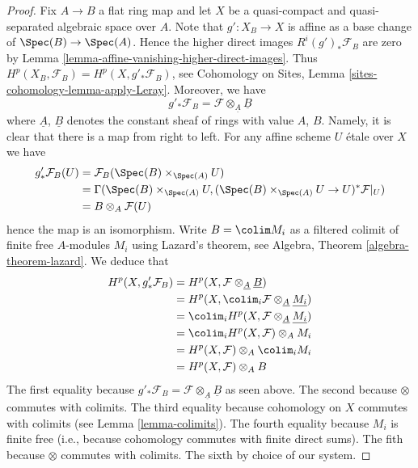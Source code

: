 \begin{proof}
\medskip\noindent
Fix $A \to B$ a flat ring map and let $X$ be a quasi-compact and
quasi-separated algebraic space over $A$. Note that $g' : X_B \to X$
is affine as a base change of $\Spec(B) \to \Spec(A)$. Hence
the higher direct images $R^i(g')_*\mathcal{F}_B$ are zero by
Lemma \ref{lemma-affine-vanishing-higher-direct-images}.
Thus $H^p(X_B, \mathcal{F}_B) = H^p(X, g'_*\mathcal{F}_B)$, see
Cohomology on Sites, Lemma \ref{sites-cohomology-lemma-apply-Leray}.
Moreover, we have
$$
g'_*\mathcal{F}_B = \mathcal{F} \otimes_{\underline{A}} \underline{B}
$$
where $\underline{A}$, $\underline{B}$ denotes the constant sheaf of
rings with value $A$, $B$. Namely, it is clear that there is a map
from right to left. For any affine scheme $U$ \'etale over $X$ we have
\begin{align*}
g'_*\mathcal{F}_B(U) & = \mathcal{F}_B(\Spec(B) \times_{\Spec(A)} U) \\
& =
\Gamma(\Spec(B) \times_{\Spec(A)} U,
(\Spec(B) \times_{\Spec(A)} U \to U)^*\mathcal{F}|_U) \\
& =
B \otimes_A \mathcal{F}(U)
\end{align*}
hence the map is an isomorphism. Write $B = \colim M_i$ as a filtered
colimit of finite free $A$-modules $M_i$ using Lazard's theorem, see
Algebra, Theorem \ref{algebra-theorem-lazard}.
We deduce that
\begin{align*}
H^p(X, g'_*\mathcal{F}_B) &
= H^p(X, \mathcal{F} \otimes_{\underline{A}} \underline{B}) \\
& = H^p(X, \colim_i \mathcal{F} \otimes_{\underline{A}} \underline{M_i}) \\
& = \colim_i H^p(X, \mathcal{F} \otimes_{\underline{A}} \underline{M_i}) \\
& = \colim_i H^p(X, \mathcal{F}) \otimes_A M_i \\
& = H^p(X, \mathcal{F}) \otimes_A \colim_i M_i \\
& = H^p(X, \mathcal{F}) \otimes_A B
\end{align*}
The first equality because
$g'_*\mathcal{F}_B = \mathcal{F} \otimes_{\underline{A}} \underline{B}$
as seen above.
The second because $\otimes$ commutes with colimits.
The third equality because cohomology on $X$ commutes with
colimits (see
Lemma \ref{lemma-colimits}).
The fourth equality because $M_i$ is finite free (i.e., because cohomology
commutes with finite direct sums).
The fith because $\otimes$ commutes with colimits.
The sixth by choice of our system.
\end{proof}




